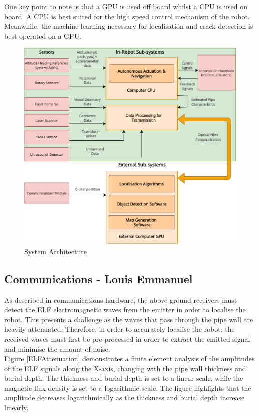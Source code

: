 \documentclass[11pt]{article}		%
\newcommand{\figref}[1]{\hyperref[#1]{Figure \ref*{#1}}}    %
\begin{document}
	          \hspace*{3ex}One key point to note is that a GPU is used off board whilst a CPU is used on board. A CPU is best suited for the high speed control mechanism of the robot. Meanwhile, the machine learning necessary for localisation and crack detection is best operated on a GPU.
	          
		      \begin{figure}[h]
						\centering
						\includegraphics[scale=1]{Systems-overall.pdf}
						\caption{System Architecture}
						\label{overalls}
					\end{figure}
		      
		\subsection[Communications]{Communications - Louis Emmanuel}
		
			As described in communications hardware, the above ground receivers must detect the ELF electromagnetic waves from the emitter in order to localise the robot.
			This presents a challenge as the waves that pass through the pipe wall are heavily attenuated. 
			Therefore, in order to accurately localise the robot, the received waves must first be pre-processed in order to extract the emitted signal and minimise the amount of noise.
			\\
		    \hspace*{3ex}\figref{ELFAttenuation}  demonstrates a finite element analysis of the amplitudes of the ELF signals along the X-axis, changing with the pipe wall thickness and burial depth.
		    The thickness and burial depth is set to a linear scale, while the magnetic flux density is set to a logarithmic scale.
		    The figure highlights that the amplitude decreases logarithmically as the thickness and burial depth increase linearly.
		    
\end{document}
